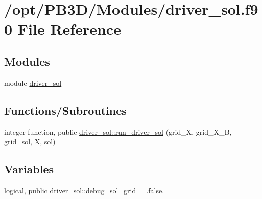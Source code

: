\hypertarget{driver__sol_8f90}{}\section{/opt/\+P\+B3\+D/\+Modules/driver\+\_\+sol.f90 File Reference}
\label{driver__sol_8f90}
\subsection*{Modules}
\begin{DoxyCompactItemize}
\item 
module \hyperlink{namespacedriver__sol}{driver\+\_\+sol}
\end{DoxyCompactItemize}
\subsection*{Functions/\+Subroutines}
\begin{DoxyCompactItemize}
\item 
integer function, public \hyperlink{namespacedriver__sol_a208ddea649ee160b7a55da8d0a5d4847}{driver\+\_\+sol\+::run\+\_\+driver\+\_\+sol} (grid\+\_\+X, grid\+\_\+\+X\+\_\+B, grid\+\_\+sol, X, sol)
\end{DoxyCompactItemize}
\subsection*{Variables}
\begin{DoxyCompactItemize}
\item 
logical, public \hyperlink{namespacedriver__sol_a00a6ea22e1eda4ae9ec46da624d0cfb0}{driver\+\_\+sol\+::debug\+\_\+sol\+\_\+grid} = .false.
\end{DoxyCompactItemize}
